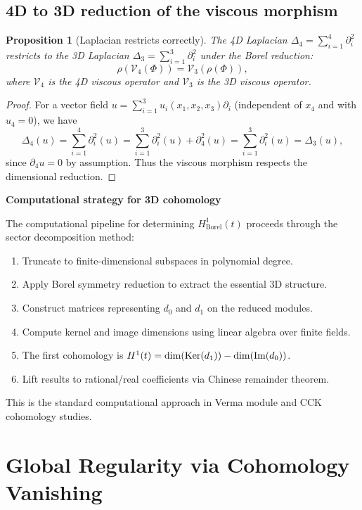 \documentclass[reqno,10pt]{amsart}
\theoremstyle{plain}
\newtheorem{proposition}[theorem]{Proposition}
\theoremstyle{definition}
\def\Ker{{\rm Ker}}
\begin{document}
\subsection{4D to 3D reduction of the viscous morphism}

\begin{proposition}[Laplacian restricts correctly]
The 4D Laplacian $\Delta_4 = \sum_{i=1}^4 \partial_i^2$ restricts to the 3D Laplacian $\Delta_3 = \sum_{i=1}^3 \partial_i^2$ under the Borel reduction:
\[
  \rho(\mathcal{V}_4(\Phi)) = \mathcal{V}_3(\rho(\Phi)),
\]
where $\mathcal{V}_4$ is the 4D viscous operator and $\mathcal{V}_3$ is the 3D viscous operator.
\end{proposition}

\begin{proof}
For a vector field $u = \sum_{i=1}^3 u_i(x_1,x_2,x_3)\partial_i$ (independent of $x_4$ and with $u_4=0$), we have
\[
  \Delta_4(u) = \sum_{i=1}^4\partial_i^2(u) = \sum_{i=1}^3\partial_i^2(u) + \partial_4^2(u) = \sum_{i=1}^3\partial_i^2(u) = \Delta_3(u),
\]
since $\partial_4 u = 0$ by assumption. Thus the viscous morphism respects the dimensional reduction.
\end{proof}

\textbf{Computational strategy for 3D cohomology}

The computational pipeline for determining $H^1_{\text{Borel}}(t)$ proceeds through the sector decomposition method:

\begin{enumerate}
\item Truncate to finite-dimensional subspaces in polynomial degree.
\item Apply Borel symmetry reduction to extract the essential 3D structure.
\item Construct matrices representing $d_0$ and $d_1$ on the reduced modules.
\item Compute kernel and image dimensions using linear algebra over finite fields.
\item The first cohomology is $H^1(t) = \dim(\Ker(d_1)) - \dim(\text{Im}(d_0))$.
\item Lift results to rational/real coefficients via Chinese remainder theorem.
\end{enumerate}

This is the standard computational approach in Verma module and CCK cohomology studies.

\section{Global Regularity via Cohomology Vanishing}
\end{document}
